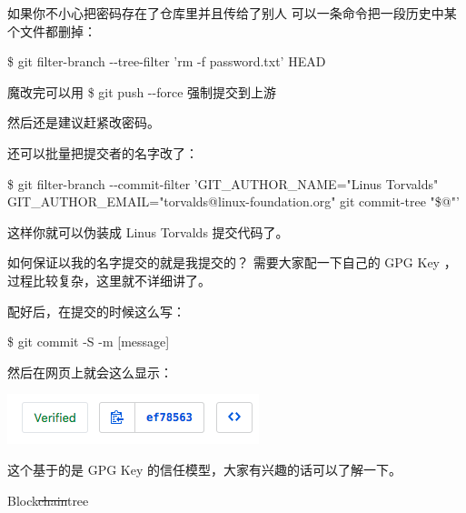 \documentclass{beamer}
\begin{document}
\begin{frame}{如果你不小心把密码存在了仓库里并且传给了别人}
    可以一条命令把一段历史中某个文件都删掉：

    \$ git filter-branch -{}-tree-filter 'rm -f password.txt' HEAD

    魔改完可以用 \$ git push -{}-force 强制提交到上游

    然后还是建议赶紧改密码。

    还可以批量把提交者的名字改了：

    \$ git filter-branch -{}-commit-filter 'GIT\_AUTHOR\_NAME="Linus Torvalds" GIT\_AUTHOR\_EMAIL="torvalds@linux-foundation.org" git commit-tree "\$@"'

    这样你就可以伪装成 Linus Torvalds 提交代码了。
\end{frame}

\begin{frame}{如何保证以我的名字提交的就是我提交的？}
    需要大家配一下自己的 GPG Key ，过程比较复杂，这里就不详细讲了。

    配好后，在提交的时候这么写：

    \$ git commit -S -m [message]

    然后在网页上就会这么显示：

    \includegraphics[width=\linewidth]{2018-10-26-20-16-02.png}

    这个基于的是 GPG Key 的信任模型，大家有兴趣的话可以了解一下。
\end{frame}

\begin{frame}{Block\st{chain}tree}

\end{frame}
\end{document}
